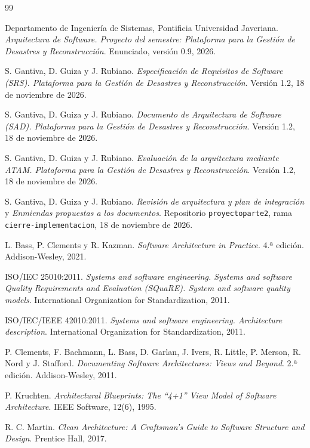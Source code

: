 \documentclass[11pt,a4paper]{article}
\begin{document}
\begin{thebibliography}{99}

Departamento de Ingeniería de Sistemas, Pontificia Universidad Javeriana. \textit{Arquitectura de
Software. Proyecto del semestre: Plataforma para la Gestión de Desastres y Reconstrucción}.
Enunciado, versión 0.9, 2026.

S. Gantiva, D. Guiza y J. Rubiano. \textit{Especificación de Requisitos de Software (SRS). Plataforma para la Gestión
de Desastres y Reconstrucción}. Versión 1.2, 18 de noviembre de 2026.

S. Gantiva, D. Guiza y J. Rubiano. \textit{Documento de Arquitectura de Software (SAD). Plataforma para la Gestión de
Desastres y Reconstrucción}. Versión 1.2, 18 de noviembre de 2026.

S. Gantiva, D. Guiza y J. Rubiano. \textit{Evaluación de la arquitectura mediante ATAM. Plataforma para la Gestión de
Desastres y Reconstrucción}. Versión 1.2, 18 de noviembre de 2026.

S. Gantiva, D. Guiza y J. Rubiano. \textit{Revisión de arquitectura y plan de integración} y \textit{Enmiendas
propuestas a los documentos}. Repositorio \texttt{proyectoparte2}, rama \texttt{cierre-implementacion}, 18 de noviembre
de 2026.

L. Bass, P. Clements y R. Kazman. \textit{Software Architecture in Practice}. 4.ª edición.
Addison-Wesley, 2021.

ISO/IEC 25010:2011. \textit{Systems and software engineering. Systems and software Quality
Requirements and Evaluation (SQuaRE). System and software quality models}. International
Organization for Standardization, 2011.

ISO/IEC/IEEE 42010:2011. \textit{Systems and software engineering. Architecture description}.
International Organization for Standardization, 2011.

P. Clements, F. Bachmann, L. Bass, D. Garlan, J. Ivers, R. Little, P. Merson, R. Nord y J. Stafford.
\textit{Documenting Software Architectures: Views and Beyond}. 2.ª edición. Addison-Wesley, 2011.

P. Kruchten. \textit{Architectural Blueprints: The ``4+1'' View Model of Software
Architecture}. IEEE Software, 12(6), 1995.

R. C. Martin. \textit{Clean Architecture: A Craftsman's Guide to Software Structure and Design}.
Prentice Hall, 2017.

\end{thebibliography}
\end{document}
